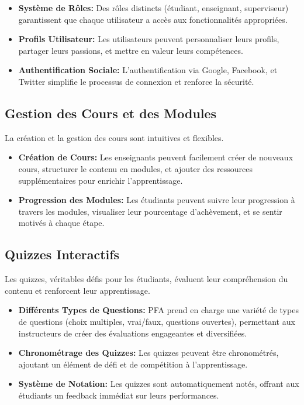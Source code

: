 \begin{itemize}
    \item \textbf{Système de Rôles:} Des rôles distincts (étudiant, enseignant, superviseur) garantissent que chaque utilisateur a accès aux fonctionnalités appropriées.
    \item \textbf{Profils Utilisateur:} Les utilisateurs peuvent personnaliser leurs profils, partager leurs passions, et mettre en valeur leurs compétences.
    \item \textbf{Authentification Sociale:} L'authentification via Google, Facebook, et Twitter simplifie le processus de connexion et renforce la sécurité.
\end{itemize}

\subsection{Gestion des Cours et des Modules}

La création et la gestion des cours sont intuitives et flexibles.

\begin{itemize}
    \item \textbf{Création de Cours:} Les enseignants peuvent facilement créer de nouveaux cours, structurer le contenu en modules, et ajouter des ressources supplémentaires pour enrichir l'apprentissage.
    \item \textbf{Progression des Modules:} Les étudiants peuvent suivre leur progression à travers les modules, visualiser leur pourcentage d'achèvement, et se sentir motivés à chaque étape.
\end{itemize}

\subsection{Quizzes Interactifs}

Les quizzes, véritables défis pour les étudiants, évaluent leur compréhension du contenu et renforcent leur apprentissage.

\begin{itemize}
    \item \textbf{Différents Types de Questions:} PFA prend en charge une variété de types de questions (choix multiples, vrai/faux, questions ouvertes), permettant aux instructeurs de créer des évaluations engageantes et diversifiées.
    \item \textbf{Chronométrage des Quizzes:} Les quizzes peuvent être chronométrés, ajoutant un élément de défi et de compétition à l'apprentissage.
    \item \textbf{Système de Notation:} Les quizzes sont automatiquement notés, offrant aux étudiants un feedback immédiat sur leurs performances.
\end{itemize}

